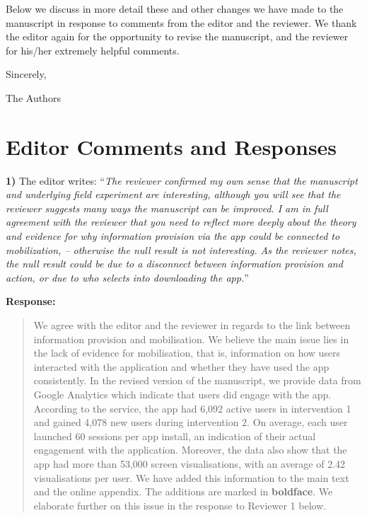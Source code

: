 \documentclass[12pt,a4paper,]{article}
\begin{document}
Below we discuss in more detail these and other changes we have made to
the manuscript in response to comments from the editor and the reviewer.
We thank the editor again for the opportunity to revise the manuscript,
and the reviewer for his/her extremely helpful comments.

\vspace{.5cm}

\noindent Sincerely,

\vspace{.5cm}

\noindent The Authors

\newpage

\hypertarget{editor-comments-and-responses}{%
\section{Editor Comments and
Responses}\label{editor-comments-and-responses}}

\textbf{1)} The editor writes: ``\emph{The reviewer confirmed my own
sense that the manuscript and underlying field experiment are
interesting, although you will see that the reviewer suggests many ways
the manuscript can be improved. I am in full agreement with the reviewer
that you need to reflect more deeply about the theory and evidence for
why information provision via the app could be connected to
mobilization, -- otherwise the null result is not interesting. As the
reviewer notes, the null result could be due to a disconnect between
information provision and action, or due to who selects into downloading
the app.}''

\vspace{.5cm}

\noindent \textbf{Response:}

\begin{quotation}
We agree with the editor and the reviewer in regards to the link between
information provision and mobilisation. We believe the main issue lies in the
lack of evidence for mobilisation, that is, information on how users interacted
with the application and whether they have used the app consistently. In the
revised version of the manuscript, we provide data from Google Analytics which
indicate that users did engage with the app. According to the service, the app
had 6,092 active users in intervention 1 and gained 4,078 new users during
intervention 2. On average, each user launched 60 sessions per app install, an
indication of their actual engagement with the application. Moreover, the data
also show that the app had more than 53,000 screen visualisations, with an
average of 2.42 visualisations per user. We have added this information to the
main text and the online appendix. The additions are marked in \textbf{boldface}.
We elaborate further on this issue in the response to Reviewer 1 below.
\end{quotation}
\end{document}
